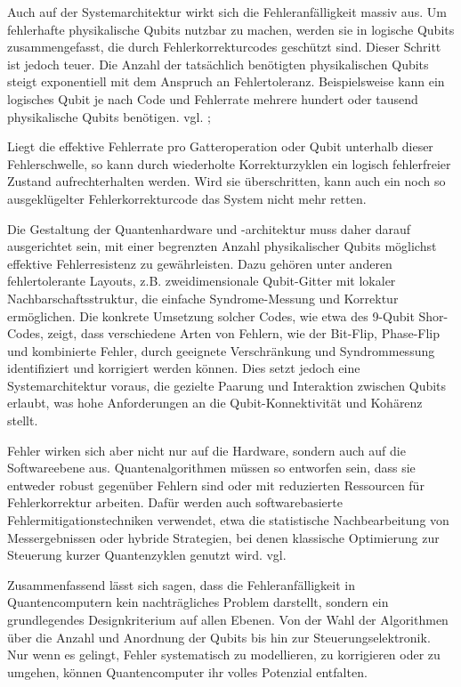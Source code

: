 Auch auf der Systemarchitektur wirkt sich die Fehleranfälligkeit massiv aus. Um fehlerhafte physikalische Qubits nutzbar zu machen, werden sie in logische Qubits zusammengefasst, die durch Fehlerkorrekturcodes geschützt sind. Dieser Schritt ist jedoch teuer. Die Anzahl der tatsächlich benötigten physikalischen Qubits steigt exponentiell mit dem Anspruch an Fehlertoleranz. Beispielsweise kann ein logisches Qubit je nach Code und Fehlerrate mehrere hundert oder tausend physikalische Qubits benötigen. vgl. \cite[Seite 435–437]{nielsen_quantum_2010}; \cite[Seite 246-253]{rieffelQuantumComputingGentle2011a}\medskip

Liegt die effektive Fehlerrate pro Gatteroperation oder Qubit unterhalb dieser Fehlerschwelle, so kann durch wiederholte Korrekturzyklen ein logisch fehlerfreier Zustand aufrechterhalten werden. Wird sie überschritten, kann auch ein noch so ausgeklügelter Fehlerkorrekturcode das System nicht mehr retten.

Die Gestaltung der Quantenhardware und -architektur muss daher darauf ausgerichtet sein, mit einer begrenzten Anzahl physikalischer Qubits möglichst effektive Fehlerresistenz zu gewährleisten. Dazu gehören unter anderen fehlertolerante Layouts, z.B. zweidimensionale Qubit-Gitter mit lokaler Nachbarschaftsstruktur, die einfache Syndrome-Messung und Korrektur ermöglichen.
Die konkrete Umsetzung solcher Codes, wie etwa des 9-Qubit Shor-Codes, zeigt, dass verschiedene Arten von Fehlern, wie der Bit-Flip, Phase-Flip und kombinierte Fehler, durch geeignete Verschränkung und Syndrommessung identifiziert und korrigiert werden können. Dies setzt jedoch eine Systemarchitektur voraus, die gezielte Paarung und Interaktion zwischen Qubits erlaubt, was hohe Anforderungen an die Qubit-Konnektivität und Kohärenz stellt.\medskip

Fehler wirken sich aber nicht nur auf die Hardware, sondern auch auf die Softwareebene aus. Quantenalgorithmen müssen so entworfen sein, dass sie entweder robust gegenüber Fehlern sind oder mit reduzierten Ressourcen für Fehlerkorrektur arbeiten. Dafür werden auch softwarebasierte Fehlermitigationstechniken verwendet, etwa die statistische Nachbearbeitung von Messergebnissen oder hybride Strategien, bei denen klassische Optimierung zur Steuerung kurzer Quantenzyklen genutzt wird. vgl. \cite[Seite 305-306]{rieffelQuantumComputingGentle2011a}\medskip

Zusammenfassend lässt sich sagen, dass die Fehleranfälligkeit in Quantencomputern kein nachträgliches Problem darstellt, sondern ein grundlegendes Designkriterium auf allen Ebenen. Von der Wahl der Algorithmen über die Anzahl und Anordnung der Qubits bis hin zur Steuerungselektronik. Nur wenn es gelingt, Fehler systematisch zu modellieren, zu korrigieren oder zu umgehen, können Quantencomputer ihr volles Potenzial entfalten.

